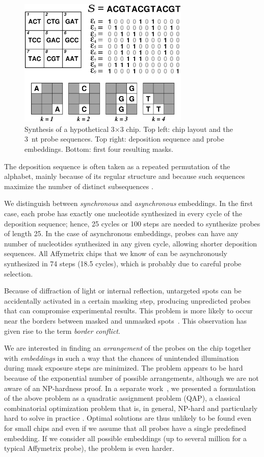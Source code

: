\documentclass{llncs}
\begin{document}
\begin{figure}
\centerline{\includegraphics[width=230pt]{chip}}
\caption{Synthesis of a hypothetical 3$\times$3 chip. Top left: chip
layout and the 3~nt probe sequences. Top right: deposition
sequence and probe embeddings. Bottom: first four resulting masks.}
\label{fig:masking_process}
\vspace*{-2ex}
\end{figure}

The deposition sequence is often taken as a repeated permutation of the
alphabet, mainly because of its regular structure and because such sequences
maximize the number of distinct subsequences \cite{CHASE76}.  

We distinguish between \emph{synchronous} and \emph{asynchronous} embeddings.
In the first case, each probe has exactly one nucleotide synthesized in every
cycle of the deposition sequence; hence, 25 cycles or 100 steps are needed to
synthesize probes of length 25.  In the case of asynchronous embeddings,
probes can have any number of nucleotides synthesized in any given cycle,
allowing shorter deposition sequences. All Affymetrix chips that we know of
can be asynchronously synthesized in 74 steps (18.5 cycles), which is probably
due to careful probe selection.

Because of diffraction of light or internal reflection, untargeted spots can
be accidentally activated in a certain masking step, producing unpredicted
probes that can compromise experimental results. This problem is more likely
to occur near the borders between masked and unmasked spots~\cite{FODOR91}.
This observation has given rise to the term \emph{border conflict}.


We are interested in finding an \emph{arrangement} of the probes on the chip
together with \emph{embeddings} in such a way that the chances of unintended
illumination during mask exposure steps are minimized. The problem appears to
be hard because of the exponential number of possible arrangements, although
we are not aware of an NP-hardness proof.  In a separate
work~\cite{CARVALHO06}, we presented a formulation of the above problem as a
quadratic assignment problem (QAP), a classical combinatorial optimization
problem that is, in general, NP-hard and particularly hard to solve in
practice \cite{CELA98}. Optimal solutions are thus unlikely to be found even
for small chips and even if we assume that all probes have a single predefined
embedding. If we consider all possible embeddings (up to several million for a
typical Affymetrix probe), the problem is even harder.
\end{document}
